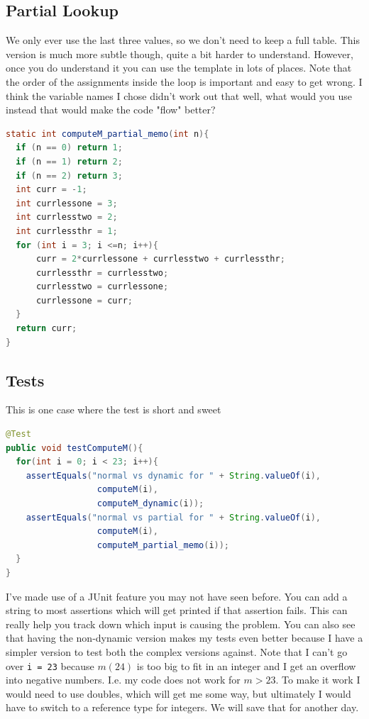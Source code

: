 \documentclass[twoside=false,DIV=14]{scrartcl}
\begin{document}
\subsection{Partial Lookup}
We only ever use the last three values, so we don't need to keep a full table.  This version is much more subtle though, quite a bit harder to understand.  However, once you do understand it you can use the template in lots of places.  Note that the order of the assignments inside the loop is important and easy to get wrong.  I think the variable names I chose didn't work out that well, what would you use instead that would make the code "flow" better?
\begin{lstlisting}[language=java]
static int computeM_partial_memo(int n){
  if (n == 0) return 1;
  if (n == 1) return 2;
  if (n == 2) return 3;
  int curr = -1;
  int currlessone = 3;
  int currlesstwo = 2;
  int currlessthr = 1;
  for (int i = 3; i <=n; i++){
      curr = 2*currlessone + currlesstwo + currlessthr;
      currlessthr = currlesstwo;
      currlesstwo = currlessone;
      currlessone = curr;
  }
  return curr;
}
\end{lstlisting}

\subsection{Tests}
This is one case where the test is short and sweet
\begin{lstlisting}[language=java]
@Test
public void testComputeM(){
  for(int i = 0; i < 23; i++){
    assertEquals("normal vs dynamic for " + String.valueOf(i),
                  computeM(i), 
                  computeM_dynamic(i));
    assertEquals("normal vs partial for " + String.valueOf(i),
                  computeM(i), 
                  computeM_partial_memo(i));
  }
}
\end{lstlisting}
I've made use of a JUnit feature you may not have seen before.  You can add a string to most assertions which will get printed if that assertion fails.  This can really help you track down which input is causing the problem.  You can also see that having the non-dynamic version makes my tests even better because I have a simpler version to test both the complex versions against.  Note that I can't go over \verb|i = 23| because $m(24)$ is too big to fit in an integer and I get an overflow into negative numbers.  I.e. my code does not work for $m > 23$.  To make it work I would need to use doubles, which will get me some way, but ultimately I would have to switch to a reference type for integers.  We will save that for another day.
\end{document}
